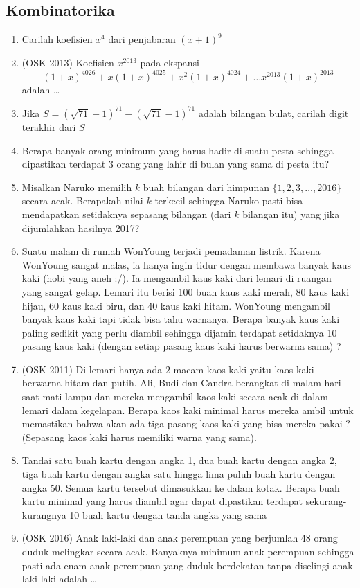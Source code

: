 \documentclass[11pt]{scrartcl}
\begin{document}
\subsection{Kombinatorika}
\begin{enumerate}
    \item Carilah koefisien $x^4$ dari penjabaran $(x+1)^9$
    
    \item (OSK 2013) Koefisien $x^{2013}$ pada ekspansi
    $$(1+x)^{4026}+x(1+x)^{4025}+x^2(1+x)^{4024}+\dots x^{2013}(1+x)^{2013}$$
    adalah \dots
    
    \item Jika $S=(\sqrt{71}+1)^{71}-(\sqrt{71}-1)^{71}$ adalah bilangan bulat, carilah digit terakhir dari $S$
    \item Berapa banyak orang minimum yang harus hadir di suatu pesta sehingga dipastikan terdapat 3 orang yang lahir di bulan yang sama di pesta itu?
    
    \item Misalkan Naruko memilih $k$ buah bilangan dari himpunan $\{1,2,3,\dots,2016\}$ secara acak. Berapakah nilai $k$ terkecil sehingga Naruko pasti bisa mendapatkan setidaknya sepasang bilangan (dari $k$ bilangan itu) yang jika dijumlahkan hasilnya 2017?
    
    \item Suatu malam di rumah WonYoung terjadi pemadaman listrik. Karena WonYoung sangat malas, ia hanya ingin tidur dengan membawa banyak kaus kaki (hobi yang aneh :/). Ia mengambil kaus kaki dari lemari di ruangan yang sangat gelap. Lemari itu berisi 100 buah kaus kaki merah, 80 kaus kaki hijau, 60 kaus kaki biru, dan 40 kaus kaki hitam. WonYoung mengambil banyak kaus kaki tapi tidak bisa tahu warnanya. Berapa banyak kaus kaki paling sedikit yang perlu diambil sehingga dijamin terdapat setidaknya 10 pasang kaus kaki (dengan setiap pasang kaus kaki harus berwarna sama) ?
    
    \item (OSK 2011) Di lemari hanya ada 2 macam kaos kaki yaitu kaos kaki berwarna hitam dan putih. 
Ali, Budi dan Candra berangkat di malam hari saat mati lampu dan mereka mengambil kaos kaki 
secara acak di dalam lemari dalam kegelapan. Berapa kaos kaki minimal harus mereka ambil untuk 
memastikan bahwa akan ada tiga pasang kaos kaki yang bisa mereka pakai ? (Sepasang kaos kaki harus 
memiliki warna yang sama).
    
    \item Tandai satu buah kartu dengan angka 1, dua buah kartu dengan angka 2, tiga buah kartu dengan 
angka satu hingga lima puluh buah kartu dengan angka 50. Semua kartu tersebut dimasukkan ke 
dalam kotak. Berapa buah kartu minimal yang harus diambil agar dapat dipastikan terdapat sekurang-kurangnya 10 buah kartu dengan tanda angka yang sama 

    \item (OSK 2016)
	Anak laki-laki dan anak perempuan yang berjumlah 48 orang duduk melingkar secara acak.
Banyaknya minimum anak perempuan sehingga pasti ada enam anak perempuan yang duduk
berdekatan tanpa diselingi anak laki-laki adalah \dots
    
\end{enumerate}
\end{document}
